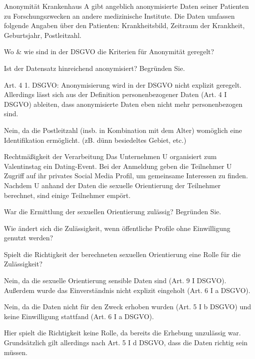 \documentclass{article}
\begin{document}
\begin{eexercises}{Anonymität}{
    Krankenhaus A gibt angeblich anonymisierte Daten seiner Patienten zu Forschungszwecken an andere medizinische Institute. Die Daten umfassen folgende Angaben über den Patienten: Krankheitsbild, Zeitraum der Krankheit, Geburtsjahr, Postleitzahl.
  }
  \item Wo \& wie sind in der DSGVO die Kriterien für Anonymität geregelt?
  \item Ist der Datensatz hinreichend anonymisiert? Begründen Sie.
\end{eexercises}

\begin{solutions}
  \item Art. 4 1. DSGVO: Anonymisierung wird in der DSGVO nicht explizit geregelt. Allerdings lässt sich aus der Definition personenbezogener Daten (Art. 4 I DSGVO) ableiten, dass anonymisierte Daten eben nicht mehr personenbezogen sind.
  \item Nein, da die Postleitzahl (insb. in Kombination mit dem Alter) womöglich eine Identifikation ermöglicht. (zB. dünn besiedeltes Gebiet, etc.)
\end{solutions}

\begin{eexercises}{Rechtmäßigkeit der Verarbeitung}{
    Das Unternehmen U organisiert zum Valentinstag ein Dating-Event. Bei der Anmeldung geben die Teilnehmer U Zugriff auf ihr privates Social Media Profil, um gemeinsame Interessen zu finden. Nachdem U anhand der Daten die sexuelle Orientierung der Teilnehmer berechnet, sind einige Teilnehmer empört.
  }
  \item War die Ermittlung der sexuellen Orientierung zulässig? Begründen Sie.
  \item Wie ändert sich die Zulässigkeit, wenn öffentliche Profile ohne Einwilligung genutzt werden?
  \item Spielt die Richtigkeit der berechneten sexuellen Orientierung eine Rolle für die Zulässigkeit?
\end{eexercises}

\begin{solutions}
  \item Nein, da die sexuelle Orientierung sensible Daten sind (Art. 9 I DSGVO). Außerdem wurde das Einverständnis nicht explizit eingeholt (Art. 6 I a DSGVO).
  \item Nein, da die Daten nicht für den Zweck erhoben wurden (Art. 5 I b DSGVO) und keine Einwilligung stattfand (Art. 6 I a DSGVO).
  \item Hier spielt die Richtigkeit keine Rolle, da bereits die Erhebung unzulässig war. Grundsätzlich gilt allerdings nach Art. 5 I d DSGVO, dass die Daten richtig sein müssen.
\end{solutions}
\end{document}
